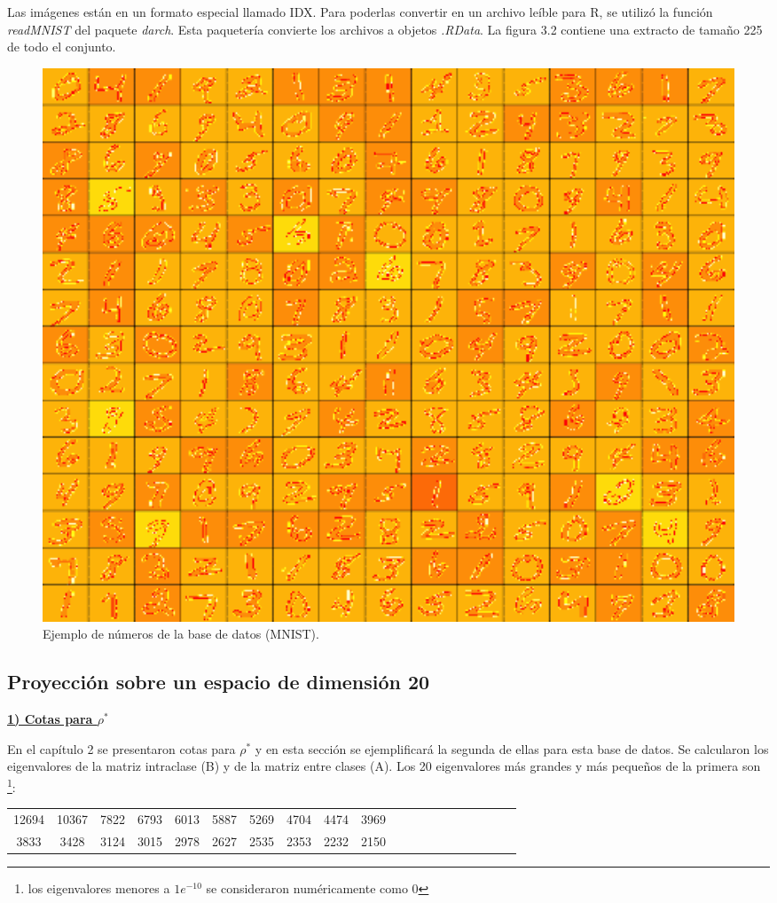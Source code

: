 Las imágenes están en un formato especial llamado IDX. Para poderlas convertir en un archivo leíble para R, se utilizó la función \textit{readMNIST} del paquete \textit{darch}. Esta paquetería convierte los archivos a objetos \textit{.RData}. La figura 3.2 contiene una extracto de tamaño 225 de todo el conjunto.

\begin{figure}[!ht]\label{fig5.2}
  \centering
	\includegraphics[width=1\textwidth]{Figures/Chapter4_numeros.png}	
  \caption{Ejemplo de números de la base de datos (MNIST).}
\end{figure}

\subsection{Proyección sobre un espacio de dimensión 20}

\underline{\textbf{1) Cotas para $\rho^*$}}

En el capítulo 2 se presentaron cotas para $\rho^*$ y en esta sección se ejemplificará la segunda de ellas para esta base de datos. Se calcularon los eigenvalores de la matriz intraclase (B) y de la matriz entre clases (A). Los 20 eigenvalores más grandes y más pequeños de la primera son \footnote{los eigenvalores menores a $1e^{-10}$ se consideraron numéricamente como 0}:

\begin{center}
\begin{tabular}{ | c | c|  c |c | c|  c |c | c|  c |c | c | c|  c |c | c|  c |c | c|  c |c |} 
\hline
12694 & 10367 & 7822 & 6793 & 6013 & 5887 & 5269 & 4704 & 4474 & 3969 \\
3833 & 3428 & 3124 & 3015 & 2978 & 2627 & 2535 & 2353 & 2232 & 2150 \\
\hline
\hline
\end{tabular}
\end{center}

